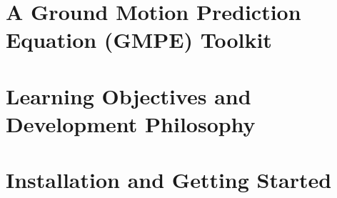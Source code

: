 \section{A Ground Motion Prediction Equation (GMPE) Toolkit}
\label{sec:gmpe_toolkit}

\section{Learning Objectives and Development Philosophy}

\section{Installation and Getting Started}

